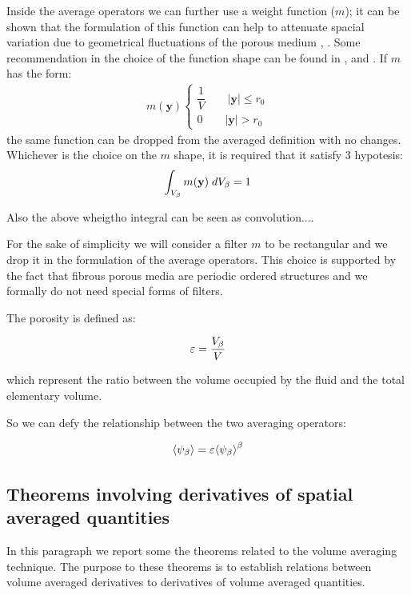 Inside the average operators we can further use a weight function ($m$); it can be shown that the formulation of this function can help to attenuate spacial variation due to geometrical fluctuations of the porous medium \citet{quintard1994transport4}, \cite{quintard1994transport2}.
Some recommendation in the choice of the function shape can be found in \citet{quintard1994transport1}, \citet{quintard1994transport2} and \citet{davit2017technical}.
If $m$ has the form:
\begin{eqnarray}
m(\mathbf{y}) 
\begin{cases}
\dfrac{1}{V} \qquad |\mathbf{y}| \leqslant r_0\\
0 \qquad |\mathbf{y}|> r_0
\end{cases}
\end{eqnarray}
the same function can be dropped from the averaged definition with no changes.
Whichever is the choice on the $m$ shape, it is required that it satisfy 3 hypotesis:
$$
\int_{V_\beta}  m(\mathbf{y}) \; dV_\beta = 1
$$

Also the above wheigtho integral can be seen as convolution....

For the sake of simplicity we will consider a filter $m$ to be rectangular and we drop it in the formulation of the average operators.
This choice is supported by the fact that fibrous porous media are periodic ordered structures and we formally do not need special forms of filters.

The porosity is defined as:

\begin{equation}
	\varepsilon = \dfrac{V_\beta}{V}
	\label{eq:porosity}
\end{equation}

which represent the ratio between the volume occupied by the fluid and the total elementary volume.

So we can defy the relationship between the two averaging operators:

\begin{equation}
	{\left< \psi_{\beta} \right>} =  \varepsilon {\left< \psi_{\beta} \right>}^{\beta}
	\label{eq:means_vs_meani}
\end{equation}

\subsection{Theorems involving derivatives of spatial averaged quantities}

In this paragraph we report some the theorems related to the volume averaging technique. The purpose to these theorems is to establish relations between volume averaged derivatives to derivatives of volume averaged quantities.

